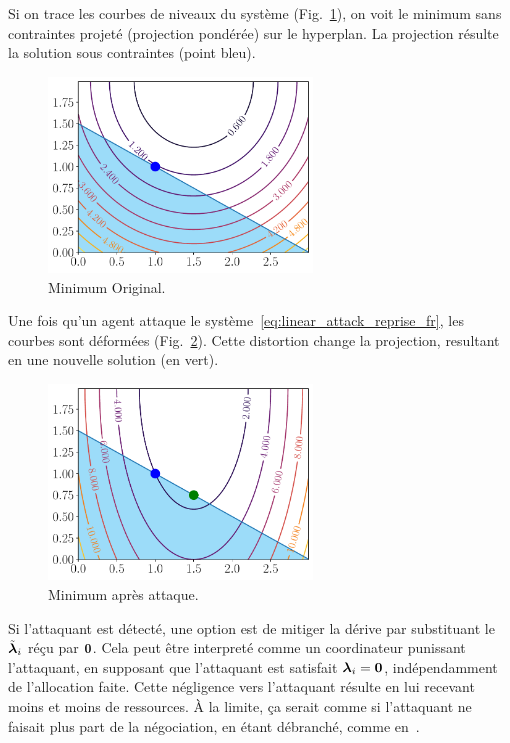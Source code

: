 \documentclass[../main.tex]{subfiles}
\begin{document}
Si on trace les courbes de niveaux du système (Fig.~\ref{fig:original_minimum_fr}), on voit le minimum sans contraintes projeté (projection pondérée) sur le hyperplan.
La projection résulte la solution sous contraintes (point bleu).
\begin{figure}[h]
  \centering
  \includegraphics[width=7cm]{../img/resilient_eq/original-minimum.pdf}
  \caption{Minimum Original.}\label{fig:original_minimum_fr}
\end{figure}

Une fois qu'un agent attaque le système~\eqref{eq:linear_attack_reprise_fr}, les courbes sont déformées (Fig.~\ref{fig:minimum_after_attack_fr}).
Cette distortion change la projection, resultant en une nouvelle solution (en vert).
\begin{figure}[h]
  \centering
  \includegraphics[width=7cm]{../img/resilient_eq/new-minimum-selfish.pdf}
  \caption{Minimum après attaque.}\label{fig:minimum_after_attack_fr}
\end{figure}

Si l'attaquant est détecté, une option est de mitiger la dérive par substituant le $\tilde{\boldsymbol{\lambda}}_{i}$ réçu par $\mathbf{0}$.
Cela peut être interpreté comme un coordinateur punissant l'attaquant, en supposant que l'attaquant est satisfait $\boldsymbol{\lambda}_{i}=\mathbf{0}$, indépendamment de l'allocation faite.
Cette négligence vers l'attaquant résulte en lui recevant moins et moins de ressources.
À la limite, ça serait comme si l'attaquant ne faisait plus part de la négociation, en étant débranché, comme en~\cite{VelardeEtAl2018,MaestreEtAl2021}.
\end{document}
